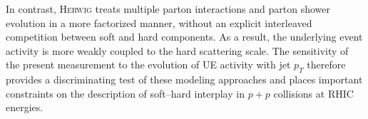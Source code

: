 In contrast, \textsc{Herwig} treats multiple parton interactions and parton shower evolution in a more factorized manner, without an explicit interleaved competition between soft and hard components. As a result, the underlying event activity is more weakly coupled to the hard scattering scale. The sensitivity of the present measurement to the evolution of UE activity with jet $p_T$ therefore provides a discriminating test of these modeling approaches and places important constraints on the description of soft--hard interplay in $p+p$ collisions at RHIC energies.
